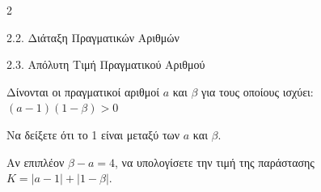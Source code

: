 \begin{ylh}{2}
    \item 2.2. Διάταξη Πραγματικών Αριθμών
    \item 2.3. Απόλυτη Τιμή Πραγματικού Αριθμού
\end{ylh}
Δίνονται οι πραγματικοί αριθμοί $a$ και $\beta$ για τους οποίους ισχύει:
$(a - 1)(1 - \beta) > 0$
\begin{alist}
\item Να δείξετε ότι το 1 είναι μεταξύ των $a$ και $\beta$.
\item Αν επιπλέον $\beta - a = 4$, να υπολογίσετε την τιμή της παράστασης $K = |a - 1| + |1 - \beta|$.
\end{alist}

